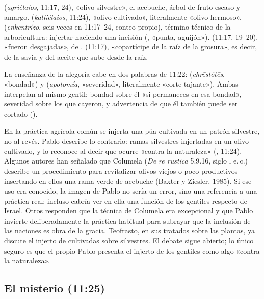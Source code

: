 \textbf{} (\emph{agriélaios}, 11:17, 24), «olivo silvestre», el acebuche, árbol de fruto escaso y amargo. \textbf{} (\emph{kalliélaios}, 11:24), «olivo cultivado», literalmente «olivo hermoso». \textbf{} (\emph{enkentrízō}, seis veces en 11:17--24, conteo propio), término técnico de la arboricultura: injertar haciendo una incisión (, «punta, aguijón»). \textbf{} (11:17, 19--20), «fueron desgajadas», de . \textbf{} (11:17), «copartícipe de la raíz de la grosura», es decir, de la savia y del aceite que sube desde la raíz.

La enseñanza de la alegoría cabe en dos palabras de 11:22:  (\emph{chrēstótēs}, «bondad») y  (\emph{apotomía}, «severidad», literalmente «corte tajante»). Ambas interpelan al mismo gentil: bondad sobre él «si permaneces en esa bondad», severidad sobre los que cayeron, y advertencia de que él también puede ser cortado ().

\begin{nota}
En la práctica agrícola común se injerta una púa cultivada en un patrón silvestre, no al revés. Pablo describe lo contrario: ramas silvestres injertadas en un olivo cultivado, y lo reconoce al decir que ocurre «contra la naturaleza» (, 11:24). Algunos autores han señalado que Columela (\emph{De re rustica} 5.9.16, siglo \textsc{i} e.\,c.) describe un procedimiento para revitalizar olivos viejos o poco productivos insertando en ellos una rama verde de acebuche (Baxter y Ziesler, 1985). Si ese uso era conocido, la imagen de Pablo no sería un error, sino una referencia a una práctica real; incluso cabría ver en ella una función de los gentiles respecto de Israel. Otros responden que la técnica de Columela era excepcional y que Pablo invierte deliberadamente la práctica habitual para subrayar que la inclusión de las naciones es obra de la gracia. Teofrasto, en sus tratados sobre las plantas, ya discute el injerto de cultivadas sobre silvestres. El debate sigue abierto; lo único seguro es que el propio Pablo presenta el injerto de los gentiles como algo «contra la naturaleza».
\end{nota}

\subsection{El misterio (11:25)}

